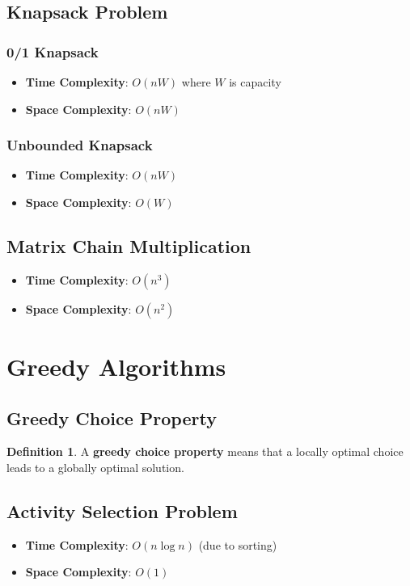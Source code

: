 \documentclass[11pt]{article}
\theoremstyle{definition}
\newtheorem{definition}{Definition}[section]
\begin{document}
\subsection{Knapsack Problem}
\subsubsection{0/1 Knapsack}
\begin{itemize}
    \item \textbf{Time Complexity}: $O(nW)$ where $W$ is capacity
    \item \textbf{Space Complexity}: $O(nW)$
\end{itemize}

\subsubsection{Unbounded Knapsack}
\begin{itemize}
    \item \textbf{Time Complexity}: $O(nW)$
    \item \textbf{Space Complexity}: $O(W)$
\end{itemize}

\subsection{Matrix Chain Multiplication}
\begin{itemize}
    \item \textbf{Time Complexity}: $O(n^3)$
    \item \textbf{Space Complexity}: $O(n^2)$
\end{itemize}

\section{Greedy Algorithms}

\subsection{Greedy Choice Property}
\begin{definition}
A \textbf{greedy choice property} means that a locally optimal choice leads to a globally optimal solution.
\end{definition}

\subsection{Activity Selection Problem}
\begin{itemize}
    \item \textbf{Time Complexity}: $O(n \log n)$ (due to sorting)
    \item \textbf{Space Complexity}: $O(1)$
\end{itemize}
\end{document}
